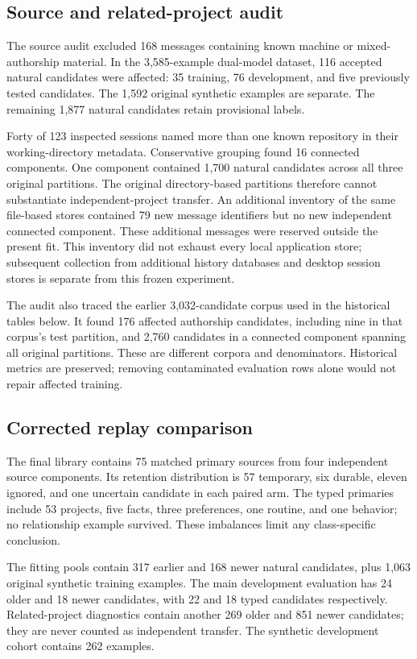\subsection{Source and related-project audit}
\label{sec:source-audit}
The source audit excluded 168 messages containing known machine or mixed-authorship material. In the 3,585-example dual-model dataset, 116 accepted natural candidates were affected: 35 training, 76 development, and five previously tested candidates. The 1,592 original synthetic examples are separate. The remaining 1,877 natural candidates retain provisional labels.

Forty of 123 inspected sessions named more than one known repository in their working-directory metadata. Conservative grouping found 16 connected components. One component contained 1,700 natural candidates across all three original partitions. The original directory-based partitions therefore cannot substantiate independent-project transfer. An additional inventory of the same file-based stores contained 79 new message identifiers but no new independent connected component. These additional messages were reserved outside the present fit. This inventory did not exhaust every local application store; subsequent collection from additional history databases and desktop session stores is separate from this frozen experiment.

The audit also traced the earlier 3,032-candidate corpus used in the historical tables below. It found 176 affected authorship candidates, including nine in that corpus's test partition, and 2,760 candidates in a connected component spanning all original partitions. These are different corpora and denominators. Historical metrics are preserved; removing contaminated evaluation rows alone would not repair affected training.

\subsection{Corrected replay comparison}
The final library contains 75 matched primary sources from four independent source components. Its retention distribution is 57 temporary, six durable, eleven ignored, and one uncertain candidate in each paired arm. The typed primaries include 53 projects, five facts, three preferences, one routine, and one behavior; no relationship example survived. These imbalances limit any class-specific conclusion.

The fitting pools contain 317 earlier and 168 newer natural candidates, plus 1,063 original synthetic training examples. The main development evaluation has 24 older and 18 newer candidates, with 22 and 18 typed candidates respectively. Related-project diagnostics contain another 269 older and 851 newer candidates; they are never counted as independent transfer. The synthetic development cohort contains 262 examples.

